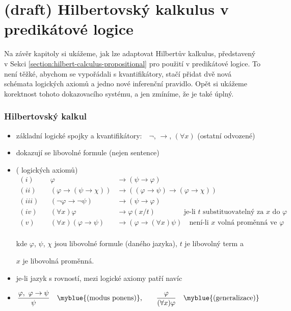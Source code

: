 
\section{(draft) Hilbertovský kalkulus v predikátové logice}
\todo

Na závěr kapitoly si ukážeme, jak lze adaptovat Hilbertův kalkulus, představený v Sekci \ref{section:hilbert-calculus-propositional} pro použití v predikátové logice. To není těžké, abychom se vypořádali s kvantifikátory, stačí přidat dvě nová schémata logických axiomů a jedno nové inferenční pravidlo. Opět si ukážeme korektnost tohoto dokazovacího systému, a jen zmíníme, že je také úplný.

\subsubsection*{Hilbertovský kalkul}
    \begin{itemize}
    \item základní logické spojky a kvantifikátory:\ \ $\neg$, $\to$, $(\forall x)$ (ostatní odvozené)
    
    \item dokazují se libovolné formule (nejen sentence)
    
    \item {} ( logických axiomů)
    \vspace{-2mm}\begin{align*}(i)& &\varphi &\to (\psi \to \varphi) \\
    (ii)& &(\varphi\to (\psi \to \chi))&\to ((\varphi \to \psi)\to(\varphi \to \chi))\qquad\qquad\qquad\qquad\phantom{\ } \\
    (iii)& &(\neg \varphi \to \neg \psi)&\to(\psi \to \varphi)\\
    (iv)& &(\forall x)\varphi &\to\varphi(x/t)\quad\quad\quad\ \ \ \text{ je-li $t$ substituovatelný za $x$ do $\varphi$}\\
    (v)& &(\forall x)(\varphi \to \psi)&\to(\varphi \to (\forall x)\psi)\quad\text{není-li $x$ volná proměnná ve $\varphi$}\\
    \end{align*}
    
    \vspace{-6mm}
    kde $\varphi$, $\psi$, $\chi$ jsou libovolné formule (daného jazyka), $t$ je libovolný term a
    \vspace{0.5mm}
    
    $x$ je libovolná proměnná.
    \smallskip
    
    \item je-li jazyk s rovností, mezi logické axiomy patří navíc 
    
    \item {}
    \vspace{-2mm}
    $$\frac{\varphi,\ \varphi \to \psi}{\psi}\quad\text{\myblue{(modus ponens)},}\qquad\frac{\varphi}{(\forall x)\varphi}\quad\text{\myblue{(generalizace)}}$$
    \end{itemize}
    
